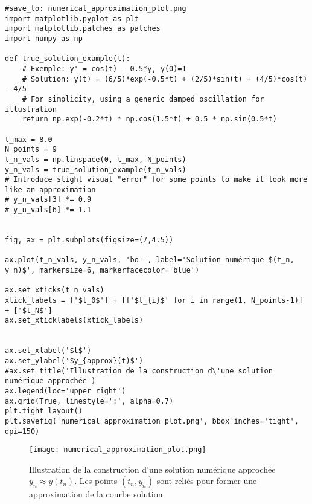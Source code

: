 \begin{verbatim}
#save_to: numerical_approximation_plot.png
import matplotlib.pyplot as plt
import matplotlib.patches as patches
import numpy as np

def true_solution_example(t):
    # Exemple: y' = cos(t) - 0.5*y, y(0)=1
    # Solution: y(t) = (6/5)*exp(-0.5*t) + (2/5)*sin(t) + (4/5)*cos(t) - 4/5
    # For simplicity, using a generic damped oscillation for illustration
    return np.exp(-0.2*t) * np.cos(1.5*t) + 0.5 * np.sin(0.5*t)

t_max = 8.0
N_points = 9
t_n_vals = np.linspace(0, t_max, N_points)
y_n_vals = true_solution_example(t_n_vals)
# Introduce slight visual "error" for some points to make it look more like an approximation
# y_n_vals[3] *= 0.9
# y_n_vals[6] *= 1.1


fig, ax = plt.subplots(figsize=(7,4.5))

ax.plot(t_n_vals, y_n_vals, 'bo-', label='Solution numérique $(t_n, y_n)$', markersize=6, markerfacecolor='blue')

ax.set_xticks(t_n_vals)
xtick_labels = ['$t_0$'] + [f'$t_{i}$' for i in range(1, N_points-1)] + ['$t_N$']
ax.set_xticklabels(xtick_labels)


ax.set_xlabel('$t$')
ax.set_ylabel('$y_{approx}(t)$')
#ax.set_title('Illustration de la construction d\'une solution numérique approchée')
ax.legend(loc='upper right')
ax.grid(True, linestyle=':', alpha=0.7)
plt.tight_layout()
plt.savefig('numerical_approximation_plot.png', bbox_inches='tight', dpi=150)
\end{verbatim}
\begin{figure}[h]
\centering
\texttt{[image: numerical\_approximation\_plot.png]}
\caption{Illustration de la construction d'une solution numérique approchée $y_n \approx y(t_n)$. Les points $(t_n,y_n)$ sont reliés pour former une approximation de la courbe solution.}
\label{fig:numerical_approximation_plot}
\end{figure}


